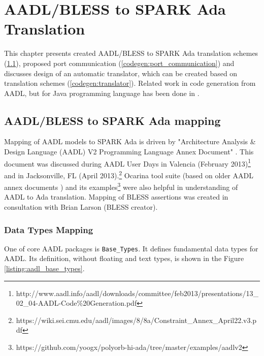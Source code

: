 
\cleardoublepage


\chapter{AADL/BLESS to SPARK Ada Translation}
\label{codegen}

This chapter presents created AADL/BLESS to SPARK Ada translation schemes (\ref{codegen:mapping}), proposed port communication (\ref{codegen:port_communication}) and discusses design of an automatic translator, which can be created based on translation schemes (\ref{codegen:translator}). Related work in code generation from AADL, but for Java programming language has been done in \cite{MAP:Paper}. 



\section{AADL/BLESS to SPARK Ada mapping}
\label{codegen:mapping}


Mapping of AADL models to SPARK Ada is driven by "Architecture Analysis \& Design Language (AADL) V2 Programming Language Annex Document" \cite{AnnexDoc}. This document was discussed during AADL User Days in Valencia (February 2013)\footnote{http://www.aadl.info/aadl/downloads/committee/feb2013/presentations/13\_02\_04-AADL-Code\%20Generation.pdf} and in Jacksonville, FL (April 2013).\footnote{https://wiki.sei.cmu.edu/aadl/images/8/8a/Constraint\_Annex\_April22.v3.pdf} Ocarina tool suite (based on older AADL annex documents \cite{Ocarina:Article}) and its examples\footnote{https://github.com/yoogx/polyorb-hi-ada/tree/master/examples/aadlv2} were also helpful in understanding of AADL to Ada translation. Mapping of BLESS assertions was created in consultation with Brian Larson (BLESS creator).
 


\subsection{Data Types Mapping}
\label{codegen:mapping:data}

One of core AADL packages is \lstinline{Base_Types}. It defines fundamental data types for AADL. Its definition, without floating and text types, is shown in the Figure \ref{listing:aadl_base_types}.

